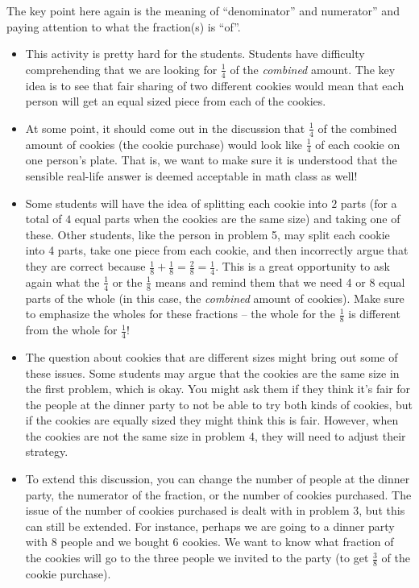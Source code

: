 \documentclass{ximera}
\begin{document}
\begin{instructorNotes}
The key point here again is the meaning of ``denominator'' and numerator'' and paying attention to what the fraction(s) is ``of''.  


 \begin{itemize}
	\item This activity is pretty hard for the students.  Students have difficulty comprehending that we are looking for $\frac14$ of the {\em combined} amount.  The key idea is to see that fair sharing of two different cookies would mean that each person will get an equal sized piece from each of the cookies. 
	\item At some point, it should come out in the discussion that $\frac14$ of the combined amount of cookies (the cookie purchase) would look like $\frac14$ of each cookie on one person's plate.  That is, we want to make sure it is understood that the sensible real-life answer is deemed acceptable in math class as well!
	\item Some students will have the idea of splitting each cookie into $2$ parts (for a total of $4$ equal parts when the cookies are the same size) and taking one of these.  Other students, like the person in problem 5,  may split each cookie into 4 parts, take one piece from each cookie, and then incorrectly argue that they are correct because $\frac{1}{8} + \frac{1}{8} = \frac{2}{8} = \frac14$.  This is a great opportunity to ask again what the $\frac14$ or the $\frac{1}{8}$ means and remind them that we need 4 or 8 equal parts of the whole (in this case, the {\em combined} amount of cookies). Make sure to emphasize the wholes for these fractions -- the whole for the $\frac{1}{8}$ is different from the whole for $\frac{1}{4}$!
	\item The question about cookies that are different sizes might bring out some of these issues. Some students may argue that the cookies are the same size in the first problem, which is okay. You might ask them if they think it's fair for the people at the dinner party to not be able to try both kinds of cookies, but if the cookies are equally sized they might think this is fair. However, when the cookies are not the same size in problem 4, they will need to adjust their strategy.
	\item To extend this discussion, you can change the number of people at the dinner party, the numerator of the fraction, or the number of cookies purchased. The issue of the number of cookies purchased is dealt with in problem 3, but this can still be extended. For instance, perhaps we are going to a dinner party with $8$ people and we bought $6$ cookies. We want to know what fraction of the cookies will go to the three people we invited to the party (to get $\frac{3}{8}$ of the cookie purchase). 

\end{itemize}
\end{instructorNotes}
\end{document}
